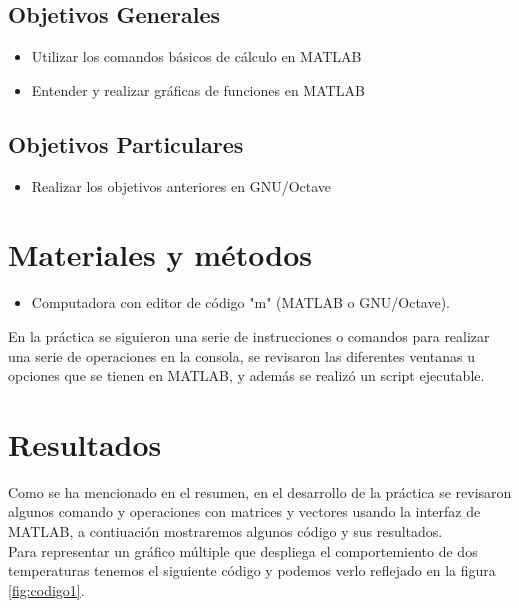 \documentclass[]{article}
\begin{document}
\subsection{Objetivos Generales}

	\begin{itemize}
		\item Utilizar los comandos básicos de cálculo en MATLAB
		\item Entender y realizar gráficas de funciones en MATLAB
	\end{itemize}

\subsection{Objetivos Particulares}

	\begin{itemize}
		\item Realizar los objetivos anteriores en GNU/Octave
	\end{itemize}

\section{Materiales y métodos}

	\begin{itemize}
		\item Computadora con editor de código "m" (MATLAB o GNU/Octave).
	\end{itemize}
	
En la práctica se siguieron una serie de instrucciones o comandos para realizar una serie de operaciones en la consola, se revisaron las diferentes ventanas u opciones que se tienen en MATLAB, y además se realizó un script ejecutable.\\


\section{Resultados}

Como se ha mencionado en el resumen, en el desarrollo de la práctica se revisaron algunos comando y operaciones con matrices y vectores usando la interfaz de MATLAB, a contiuación mostraremos algunos código y sus resultados.\\

Para representar un gráfico múltiple que despliega el comportemiento de dos temperaturas tenemos el siguiente código y podemos verlo reflejado en la figura \ref{fig:codigo1}.\\
\end{document}
